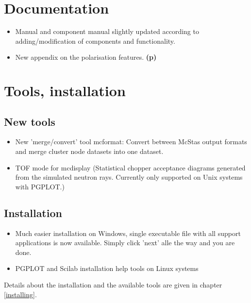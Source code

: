 \section{Documentation}
\label{s:new-features:documentation}
\begin{itemize}
\item Manual and component manual slightly updated according to
  adding/modification of components and functionality. 
\item New appendix on the polarisation features. {\bf(p)}
\end{itemize}

\section{Tools, installation}
\label{s:new-features:tools}
\subsection{New tools} 
\begin{itemize}
\item New 'merge/convert' tool mcformat: Convert between McStas output formats and merge cluster
    node datasets into one dataset.
\item TOF mode for mcdisplay (Statistical chopper acceptance diagrams generated from the simulated
    neutron rays. Currently only supported on Unix systems with PGPLOT.)
\end{itemize}
\subsection{Installation}
\begin{itemize}
\item Much easier installation on Windows, single executable file with all support applications
    is now available. Simply click 'next' alle the way and you are done.
\item PGPLOT and Scilab installation help tools on Linux systems
\end{itemize}
Details about the installation and the available tools are given in chapter \ref{installing}.

